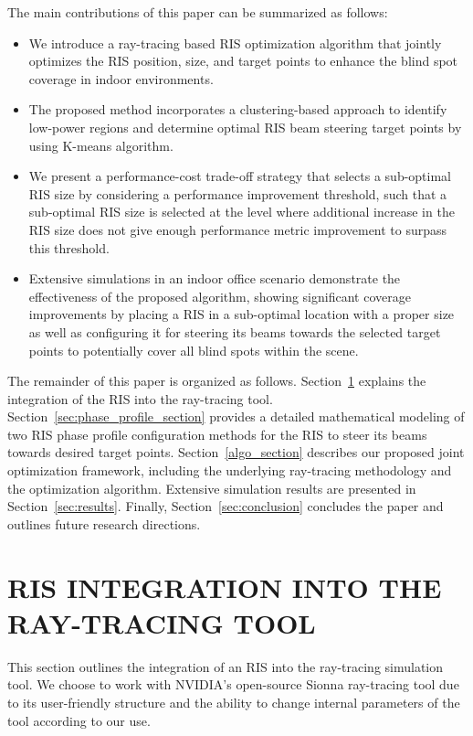 \documentclass{IEEEoj}
\begin{document}
The main contributions of this paper can be summarized as follows:
\begin{itemize}
	\item We introduce a ray-tracing based RIS optimization algorithm that jointly optimizes the RIS position, size, and target points to enhance the blind spot coverage in indoor environments.
	\item The proposed method incorporates a clustering-based approach to identify low-power regions and determine optimal RIS beam steering target points by using K-means algorithm.
	\item We present a performance-cost trade-off strategy that selects a sub-optimal RIS size by considering a performance improvement threshold, such that a sub-optimal RIS size is selected at the level where additional increase in the RIS size does not give enough performance metric improvement to surpass this threshold.
	\item Extensive simulations in an indoor office scenario demonstrate the effectiveness of the proposed algorithm, showing significant coverage improvements by placing a RIS in a sub-optimal location with a proper size as well as configuring it for steering its beams towards the selected target points to potentially cover all blind spots within the scene.
\end{itemize}

The remainder of this paper is organized as follows. Section~\ref{sec:ris_integration_into_RT} explains the integration of the RIS into the ray-tracing tool. Section~\ref{sec:phase_profile_section} provides a detailed mathematical modeling of two RIS phase profile configuration methods for the RIS to steer its beams towards desired target points. Section~\ref{algo_section} describes our proposed joint optimization framework, including the underlying ray-tracing methodology and the optimization algorithm. Extensive simulation results are presented in Section~\ref{sec:results}. Finally, Section~\ref{sec:conclusion} concludes the paper and outlines future research directions.

\section{RIS INTEGRATION INTO THE RAY-TRACING TOOL} \label{sec:ris_integration_into_RT}
This section outlines the integration of an RIS into the ray-tracing simulation tool. We choose to work with NVIDIA's open-source Sionna ray-tracing tool \cite{sionna} due to its user-friendly structure and the ability to change internal parameters of the tool according to our use.
\end{document}
